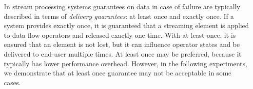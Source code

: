In stream processing systems guarantees on data in case of failure are typically described in terms of {\em delivery guarantees}: at least once and exactly once. If a system provides exactly once, it is guaranteed that a streaming element is applied to data flow operators and released exactly one time. With at least once, it is ensured that an element is not lost, but it can influence operator states and be delivered to end-user multiple times. At least once may be preferred, because it typically has lower performance overhead. However, in the following experiments, we demonstrate that at least once guarantee may not be acceptable in some cases.  




